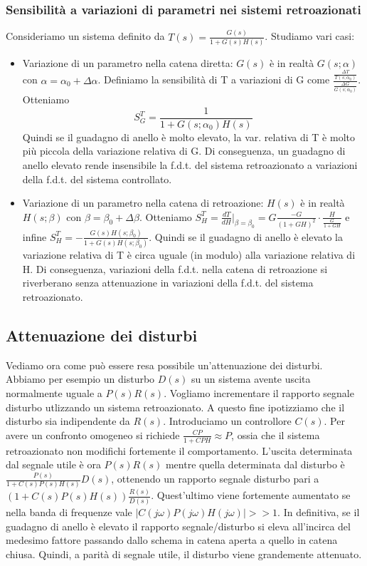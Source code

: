 \documentclass[11pt]{article}
\begin{document}
\subsubsection{Sensibilità a variazioni di parametri nei sistemi retroazionati}
Consideriamo un sistema definito da $T(s)=\frac{G(s)}{1+G(s)H(s)}$. Studiamo vari casi:
\begin{itemize}
    \item Variazione di un parametro nella catena diretta: $G(s)$ è in realtà $G(s;\alpha)$ con $\alpha=\alpha_0+\Delta\alpha$. Definiamo la sensibilità di T a variazioni di G come $\frac{\frac{\Delta T}{T(s;\alpha_0)}}{\frac{\Delta G}{G(s;\alpha_0)}}$. Otteniamo \begin{displaymath}
        S_G^T=\frac{1}{1+G(s;\alpha_0)H(s)}
    \end{displaymath} Quindi se il guadagno di anello è molto elevato, la var. relativa di T è molto più piccola della variazione relativa di G. Di conseguenza, un guadagno di anello elevato rende insensibile la f.d.t. del sistema retroazionato a variazioni della f.d.t. del sistema controllato. 
    \item Variazione di un parametro nella catena di retroazione: $H(s)$ è in realtà $H(s;\beta)$ con $\beta = \beta_0+\Delta\beta$. Otteniamo $S_H^T = \frac{dT}{dH}|_{\beta=\beta_0}=G\frac{-G}{(1+GH)^2}\cdot\frac{H}{\frac{G}{1+GH}}$ e infine $S_H^T = -\frac{G(s)H(s;\beta_0)}{1+G(s)H(s;\beta_0)}$. Quindi se il guadagno di anello è elevato la variazione relativa di T è circa uguale (in modulo) alla variazione relativa di H. Di conseguenza, variazioni della f.d.t. nella catena di retroazione si riverberano senza attenuazione in variazioni della f.d.t. del sistema retroazionato.
\end{itemize}
\subsection{Attenuazione dei disturbi}
Vediamo ora come può essere resa possibile un'attenuazione dei disturbi. Abbiamo per esempio un disturbo $D(s)$ su un sistema avente uscita normalmente uguale a $P(s)R(s)$. Vogliamo incrementare il rapporto segnale disturbo utlizzando un sistema retroazionato. A questo fine ipotizziamo che il disturbo sia indipendente da $R(s)$. Introduciamo un controllore $C(s)$. Per avere un confronto omogeneo si richiede $\frac{CP}{1+CPH} \approx P$, ossia che il sistema retroazionato non modifichi fortemente il comportamento. L'uscita determinata dal segnale utile è ora $P(s)R(s)$ mentre quella determinata dal disturbo è $\frac{P(s)}{1+C(s)P(s)H(s)}D(s)$, ottenendo un rapporto segnale disturbo pari a $\left(1+C(s)P(s)H(s)\right)\frac{R(s)}{D(s)}$. Quest'ultimo viene fortemente aumentato se nella banda di frequenze vale $|C(j\omega)P(j\omega)H(j\omega)|>>1$. In definitiva, se il guadagno di anello è elevato il rapporto segnale/disturbo si eleva all'incirca del medesimo fattore passando dallo schema in catena aperta a quello in catena chiusa. Quindi, a parità di segnale utile, il disturbo viene grandemente attenuato. 
\end{document}
